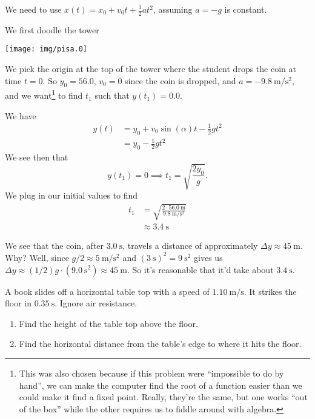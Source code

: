 \begin{soln}
\IDENTIFY
We need to use
$x(t)=x_{0}+v_{0}t+\frac{1}{2}at^{2}$, assuming $a=-g$ is
constant.

\SETUP
We first doodle the tower
\begin{center}
  \texttt{[image: img/pisa.0]}
\end{center}
We pick the origin at the top of the tower where the student
drops the coin at time $t=0$. So $y_{0}=56.0$, $v_{0}=0$ since the
coin is dropped, and $a=\SI{-9.8}{\meter\per\second\squared}$, and we
want\footnote{This was also chosen because if this problem were
  ``impossible to do by hand'', we can make the computer find the root
  of a function easier than we could make it find a fixed point. Really,
they're the same, but one works ``out of the box'' while the other
requires us to fiddle around with algebra.} to find $t_{1}$ such that $y(t_{1})=0.0$.

\EXECUTE
We have
\begin{equation}
\begin{split}
y(t) &= y_{0} + v_{0}\sin(\alpha)t - \frac{1}{2}gt^{2}\\
&=y_{0} - \frac{1}{2}gt^{2}
\end{split}
\end{equation}
We see then that
\begin{equation}
y(t_{1}) = 0\implies t_{1}=\sqrt{\frac{2y_{0}}{g}}.
\end{equation}
We plug in our initial values to find
\begin{equation}
\begin{split}
t_{1} &= \sqrt{\frac{2\cdot\SI{56.0}{\meter}}{\SI{9.8}{\meter\per\second\squared}}}\\
&\approx \SI{3.4}{\second}
\end{split}
\end{equation}

\EVALUATE
We see that the coin, after $\SI{3.0}{\second}$, travels a distance
of approximately $\Delta y\approx \SI{45}{\meter}$. Why? Well,
since $g/2\approx \SI{5}{\meter/\second\squared}$ and
$(\SI{3}{\second})^{2}=\SI{9}{\second\squared}$ gives us $\Delta y\approx(1/2)g\cdot(\SI{9.0}{\second\squared})\approx \SI{45}{\meter}$. So it's
reasonable that it'd take about $\SI{3.4}{\second}$.
\end{soln}

\makeatletter
{}
\makeatother
A book slides off a horizontal table top with a speed of
$\SI{1.10}{\meter/\second}$. It strikes the floor in
$\SI{0.35}{\second}$. Ignore air resistance.
\begin{enumerate}
\item Find the height of the table top above the floor.
\item Find the horizontal distance from the table's edge to where it
  hits the floor.
\end{enumerate}

